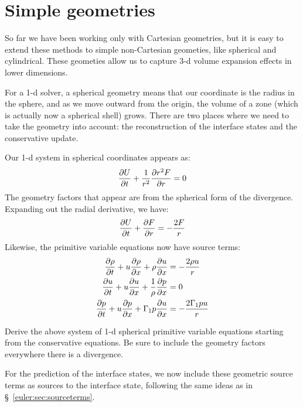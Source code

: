 \section{Simple geometries}

So far we have been working only with Cartesian geometries, but it is
easy to extend these methods to simple non-Cartesian geometies, like
spherical and cylindrical.  These geometies allow us to capture 3-d
volume expansion effects in lower dimensions.

For a 1-d solver, a spherical geometry means that our coordinate is
the radius in the sphere, and as we move outward from the origin, the
volume of a zone (which is actually now a spherical shell) grows.
There are two places where we need to take the geometry into account:
the reconstruction of the interface states and the conservative update.

Our 1-d system in spherical coordinates appears as:
\begin{equation}
{\frac{{\partial U}}{\partial t}} + \frac{1}{r^2} {\frac{{\partial r^2 F}}{\partial r}} = 0
\end{equation}
The geometry factors that appear are from the spherical form of the
divergence.  Expanding out the radial derivative, we have:
\begin{equation}
{\frac{{\partial U}}{\partial t}} + {\frac{{\partial F}}{\partial r}} = -\frac{2F}{r}
\end{equation}
Likewise, the primitive variable equations now have source terms:
\begin{align}
{\frac{{\partial\rho}}{\partial t}} + u {\frac{{\partial\rho}}{\partial x}} + \rho {\frac{{\partial u}}{\partial x}} &= -\frac{2\rho u}{r} \\
{\frac{{\partial u}}{\partial t}} + u {\frac{{\partial u}}{\partial x}} + \frac{1}{\rho} {\frac{{\partial p}}{\partial x}} &= 0 \\
{\frac{{\partial p}}{\partial t}} + u {\frac{{\partial p}}{\partial x}} + \Gamma_1 p {\frac{{\partial u}}{\partial x}} &= -\frac{2\Gamma_1 p u}{r}
\end{align}

\begin{exercise}
{Derive the above system of 1-d spherical primitive variable equations
  starting from the conservative equations.  Be sure to include the
  geometry factors everywhere there is a divergence.}
\end{exercise}

For the prediction of the interface states, we now include these
geometric source terms as sources to the interface state, following
the same ideas as in \S~\ref{euler:sec:sourceterms}.

